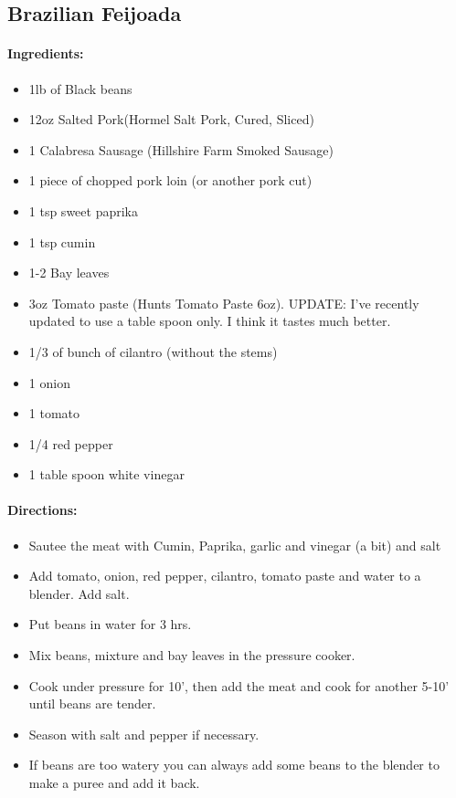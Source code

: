 \documentclass{article}
\begin{document}
\subsection{Brazilian Feijoada}

\paragraph{Ingredients:}

\begin{itemize}
	\item 1lb of Black beans 
	\item 12oz Salted Pork(Hormel Salt Pork, Cured, Sliced)
	\item 1 Calabresa Sausage (Hillshire Farm Smoked Sausage)
	\item 1 piece of chopped pork loin (or another pork cut)
	\item 1 tsp sweet paprika
	\item 1 tsp cumin
	\item 1-2 Bay leaves 
	\item 3oz Tomato paste (Hunts Tomato Paste 6oz). UPDATE: I've recently updated to use a table spoon only.  I think it tastes much better.
	\item 1/3 of bunch of cilantro (without the stems)
	\item 1 onion 
	\item 1 tomato 
	\item 1/4 red pepper 
	\item 1 table spoon white vinegar
\end{itemize}

\paragraph{Directions:}
\begin{itemize}
	\item Sautee the meat with Cumin, Paprika, garlic and vinegar (a bit) and salt
	\item Add tomato, onion, red pepper, cilantro, tomato paste and water to a blender. Add salt.
	\item Put beans in water for 3 hrs.
	\item Mix beans, mixture and bay leaves in the pressure cooker.
	\item Cook under pressure for 10', then add the meat and cook for another 5-10' until beans are tender.
	\item Season with salt and pepper if necessary.
	\item If beans are too watery you can always add some beans to the blender to make a puree and add it back.
\end{itemize}
\end{document}

